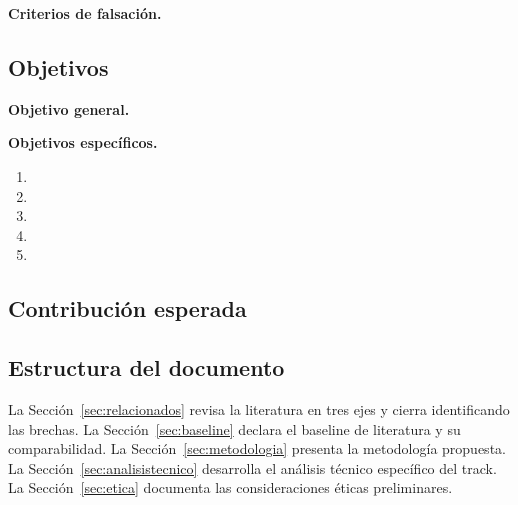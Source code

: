 \noindent\textbf{Criterios de falsación.} 

\subsection{Objetivos}
\label{subsec:objetivos}
\textbf{Objetivo general.} 

\noindent\textbf{Objetivos específicos.}
\begin{enumerate}
  \item {}
  \item {}
  \item {}
  \item {}
  \item {}
\end{enumerate}

\subsection{Contribución esperada}
\label{subsec:contribucion}

\subsection{Estructura del documento}
\label{subsec:estructura}
La Sección~\ref{sec:relacionados} revisa la literatura en tres ejes y
cierra identificando las brechas. La Sección~\ref{sec:baseline} declara
el baseline de literatura y su comparabilidad. La
Sección~\ref{sec:metodologia} presenta la metodología propuesta. La
Sección~\ref{sec:analisistecnico} desarrolla el análisis técnico
específico del track. La Sección~\ref{sec:etica} documenta las
consideraciones éticas preliminares.